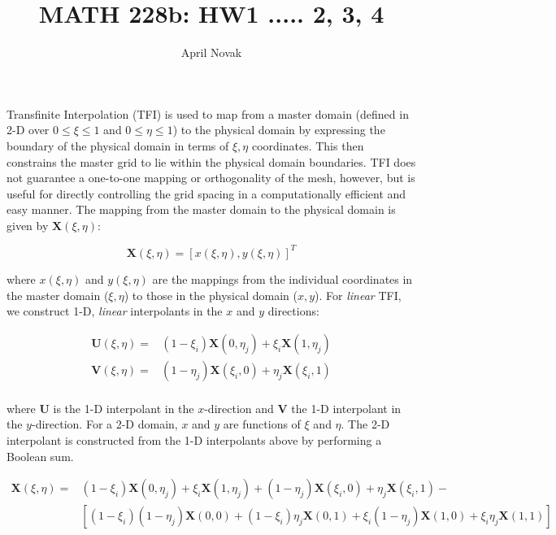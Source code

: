 \documentclass[10pt]{article}
\begin{document}
\title{MATH 228b: HW1 ..... 2, 3, 4}
\author{April Novak}

\maketitle

\section{}

Transfinite Interpolation (TFI) is used to map from a master domain (defined in 2-D over \(0\leq\xi\leq1\) and \(0\leq\eta\leq1\)) to the physical domain by expressing the boundary of the physical domain in terms of \(\xi,\eta\) coordinates. This then constrains the master grid to lie within the physical domain boundaries. TFI does not guarantee a one-to-one mapping or orthogonality of the mesh, however, but is useful for directly controlling the grid spacing in a computationally efficient and easy manner. The mapping from the master domain to the physical domain is given by \(\textbf{X}(\xi,\eta)\):

\begin{equation}
\textbf{X}(\xi,\eta)=\left\lbrack x(\xi,\eta), y(\xi,\eta)\right\rbrack^T
\end{equation}

where \(x(\xi,\eta)\) and \(y(\xi,\eta)\) are the mappings from the individual coordinates in the master domain (\(\xi,\eta\)) to those in the physical domain (\(x,y\)). For \textit{linear} TFI, we construct 1-D, \textit{linear} interpolants in the \(x\) and \(y\) directions:

\begin{equation}
\begin{aligned}
\textbf{U}(\xi,\eta)=& (1-\xi_i)\textbf{X}(0,\eta_j)+\xi_i\textbf{X}(1,\eta_j)\\
\textbf{V}(\xi,\eta)=& (1-\eta_j)\textbf{X}(\xi_i,0)+\eta_j\textbf{X}(\xi_i,1)\\
\end{aligned}
\end{equation}

where \(\textbf{U}\) is the 1-D interpolant in the \(x\)-direction and \(\textbf{V}\) the 1-D interpolant in the \(y\)-direction. For a 2-D domain, \(x\) and \(y\) are functions of \(\xi\) and \(\eta\). The 2-D interpolant is constructed from the 1-D interpolants above by performing a Boolean sum.

\begin{equation}
\begin{aligned}
\textbf{X}(\xi,\eta)=& (1-\xi_i)\textbf{X}(0,\eta_j)+\xi_i\textbf{X}(1,\eta_j) + (1-\eta_j)\textbf{X}(\xi_i,0)+\eta_j\textbf{X}(\xi_i,1) - \\
& \left\lbrack(1-\xi_i)(1-\eta_j)\textbf{X}(0,0)+(1-\xi_i)\eta_j\textbf{X}(0,1)+\xi_i(1-\eta_j)\textbf{X}(1,0)+\xi_i\eta_j\textbf{X}(1,1)\right\rbrack
\end{aligned}
\end{equation}
\end{document}

